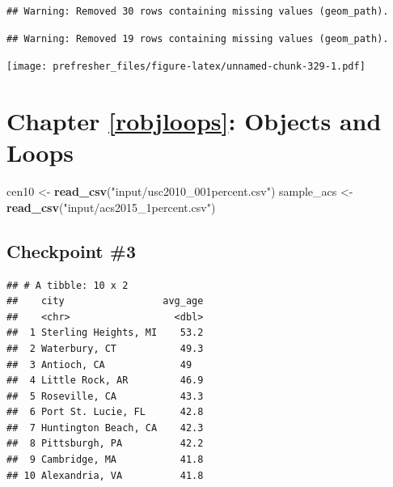 \documentclass[]{book}
\newenvironment{Shaded}{\begin{snugshade}}{\end{snugshade}}
\newcommand{\DataTypeTok}[1]{\textcolor[rgb]{0.13,0.29,0.53}{#1}}
\newcommand{\DecValTok}[1]{\textcolor[rgb]{0.00,0.00,0.81}{#1}}
\newcommand{\KeywordTok}[1]{\textcolor[rgb]{0.13,0.29,0.53}{\textbf{#1}}}
\newcommand{\NormalTok}[1]{#1}
\newcommand{\OperatorTok}[1]{\textcolor[rgb]{0.81,0.36,0.00}{\textbf{#1}}}
\newcommand{\StringTok}[1]{\textcolor[rgb]{0.31,0.60,0.02}{#1}}
\theoremstyle{definition}
\theoremstyle{definition}
\theoremstyle{definition}
\theoremstyle{remark}
\begin{document}
\begin{verbatim}
## Warning: Removed 30 rows containing missing values (geom_path).
\end{verbatim}

\begin{verbatim}
## Warning: Removed 19 rows containing missing values (geom_path).
\end{verbatim}

\texttt{[image: prefresher\_files/figure-latex/unnamed-chunk-329-1.pdf]}

\hypertarget{chapter-refrobjloops-objects-and-loops}{%
\section{Chapter \ref{robjloops}: Objects and Loops}\label{chapter-refrobjloops-objects-and-loops}}

\begin{Shaded}
\begin{Highlighting}[]
\NormalTok{cen10 <-}\StringTok{ }\KeywordTok{read_csv}\NormalTok{(}\StringTok{"input/usc2010_001percent.csv"}\NormalTok{)}
\NormalTok{sample_acs <-}\StringTok{ }\KeywordTok{read_csv}\NormalTok{(}\StringTok{"input/acs2015_1percent.csv"}\NormalTok{)}
\end{Highlighting}
\end{Shaded}

\hypertarget{checkpoint-3}{%
\subsection*{Checkpoint \#3}\label{checkpoint-3}}

\begin{Shaded}
\end{Shaded}

\begin{verbatim}
## # A tibble: 10 x 2
##    city                 avg_age
##    <chr>                  <dbl>
##  1 Sterling Heights, MI    53.2
##  2 Waterbury, CT           49.3
##  3 Antioch, CA             49  
##  4 Little Rock, AR         46.9
##  5 Roseville, CA           43.3
##  6 Port St. Lucie, FL      42.8
##  7 Huntington Beach, CA    42.3
##  8 Pittsburgh, PA          42.2
##  9 Cambridge, MA           41.8
## 10 Alexandria, VA          41.8
\end{verbatim}
\end{document}
